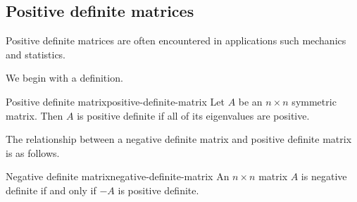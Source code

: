 \subsection{Positive definite matrices}

Positive definite matrices are often encountered in applications such mechanics and statistics.

We begin with a definition.

\begin{definition}{Positive definite matrix}{positive-definite-matrix}
Let $A$ be an $n \times n$ symmetric matrix. Then $A$ is positive definite if all of its eigenvalues are positive.
\end{definition}

The relationship between a negative definite matrix and positive definite matrix is as follows. 

\begin{lemma}{Negative definite matrix}{negative-definite-matrix}
An $n\times n$ matrix $A$ is negative definite if and only if $-A$ is
positive definite.
\end{lemma}


